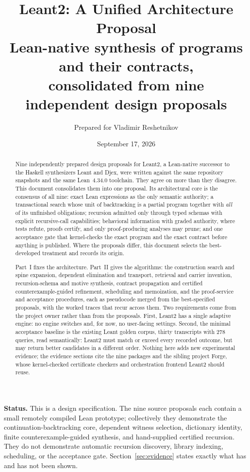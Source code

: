 \documentclass[11pt,a4paper]{article}
\title{\textbf{Leant2: A Unified Architecture Proposal}\\[6pt]
\large Lean-native synthesis of programs and their contracts,\\
consolidated from nine independent design proposals}
\author{Prepared for Vladimir Reshetnikov}
\date{September 17, 2026}
\newcommand{\code}[1]{\texttt{\detokenize{#1}}}
\theoremstyle{definition}
\theoremstyle{plain}
\theoremstyle{remark}
\begin{document}
\maketitle

\begin{abstract}
Nine independently prepared design proposals for Leant2, a Lean-native successor to the Haskell synthesizers Leant and Djex, were written against the same repository snapshots and the same Lean~4.34.0 toolchain. They agree on more than they disagree. This document consolidates them into one proposal. Its architectural core is the consensus of all nine: exact Lean expressions as the only semantic authority; a transactional search whose unit of backtracking is a partial program together with \emph{all} of its unfinished obligations; recursion admitted only through typed schemas with explicit recursive-call capabilities; behavioral information with graded authority, where tests refute, proofs certify, and only proof-producing analyses may prune; and one acceptance gate that kernel-checks the exact program and the exact contract before anything is published. Where the proposals differ, this document selects the best-developed treatment and records its origin.

Part~I fixes the architecture. Part~II gives the algorithms: the construction search and spine expansion, dependent elimination and transport, retrieval and carrier invention, recursion-schema and motive synthesis, contract propagation and certified counterexample-guided refinement, scheduling and memoization, and the proof-service and acceptance procedures, each as pseudocode merged from the best-specified proposals, with the worked traces that recur across them. Two requirements come from the project owner rather than from the proposals. First, Leant2 has a single adaptive engine: no engine switches and, for now, no user-facing settings. Second, the minimal acceptance baseline is the existing Leant \code{:synth} golden corpus, thirty transcripts with 278 queries, read semantically: Leant2 must match or exceed every recorded outcome, but may return better candidates in a different order. Nothing here adds new experimental evidence; the evidence sections cite the nine packages and the sibling project Forge, whose kernel-checked certificate checkers and orchestration frontend Leant2 should reuse.
\end{abstract}

\vspace{4pt}
\textbf{Status.} This is a design specification. The nine source proposals each contain a small remotely compiled Lean prototype; collectively they demonstrate the continuation-backtracking core, dependent witness selection, dictionary identity, finite counterexample-guided synthesis, and hand-supplied certified recursion. They do not demonstrate automatic recursion discovery, library indexing, scheduling, or the acceptance gate. Section~\ref{sec:evidence} states exactly what has and has not been shown.
\end{document}
